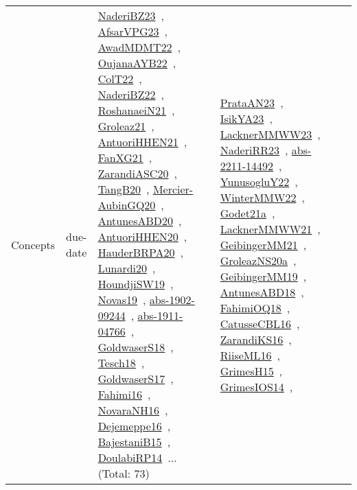 {\begin{longtable}{lp{3cm}>{\raggedright\arraybackslash}p{6cm}>{\raggedright\arraybackslash}p{6cm}>{\raggedright\arraybackslash}p{8cm}}
\index{due-date}\index{Concepts!due-date}Concepts & due-date & \href{../works/NaderiBZ23.pdf}{NaderiBZ23}~\cite{NaderiBZ23}, \href{../works/AfsarVPG23.pdf}{AfsarVPG23}~\cite{AfsarVPG23}, \href{../works/AwadMDMT22.pdf}{AwadMDMT22}~\cite{AwadMDMT22}, \href{../works/OujanaAYB22.pdf}{OujanaAYB22}~\cite{OujanaAYB22}, \href{../works/ColT22.pdf}{ColT22}~\cite{ColT22}, \href{../works/NaderiBZ22.pdf}{NaderiBZ22}~\cite{NaderiBZ22}, \href{../works/RoshanaeiN21.pdf}{RoshanaeiN21}~\cite{RoshanaeiN21}, \href{../works/Groleaz21.pdf}{Groleaz21}~\cite{Groleaz21}, \href{../works/AntuoriHHEN21.pdf}{AntuoriHHEN21}~\cite{AntuoriHHEN21}, \href{../works/FanXG21.pdf}{FanXG21}~\cite{FanXG21}, \href{../works/ZarandiASC20.pdf}{ZarandiASC20}~\cite{ZarandiASC20}, \href{../works/TangB20.pdf}{TangB20}~\cite{TangB20}, \href{../works/Mercier-AubinGQ20.pdf}{Mercier-AubinGQ20}~\cite{Mercier-AubinGQ20}, \href{../works/AntunesABD20.pdf}{AntunesABD20}~\cite{AntunesABD20}, \href{../works/AntuoriHHEN20.pdf}{AntuoriHHEN20}~\cite{AntuoriHHEN20}, \href{../works/HauderBRPA20.pdf}{HauderBRPA20}~\cite{HauderBRPA20}, \href{../works/Lunardi20.pdf}{Lunardi20}~\cite{Lunardi20}, \href{../works/HoundjiSW19.pdf}{HoundjiSW19}~\cite{HoundjiSW19}, \href{../works/Novas19.pdf}{Novas19}~\cite{Novas19}, \href{../works/abs-1902-09244.pdf}{abs-1902-09244}~\cite{abs-1902-09244}, \href{../works/abs-1911-04766.pdf}{abs-1911-04766}~\cite{abs-1911-04766}, \href{../works/GoldwaserS18.pdf}{GoldwaserS18}~\cite{GoldwaserS18}, \href{../works/Tesch18.pdf}{Tesch18}~\cite{Tesch18}, \href{../works/GoldwaserS17.pdf}{GoldwaserS17}~\cite{GoldwaserS17}, \href{../works/Fahimi16.pdf}{Fahimi16}~\cite{Fahimi16}, \href{../works/NovaraNH16.pdf}{NovaraNH16}~\cite{NovaraNH16}, \href{../works/Dejemeppe16.pdf}{Dejemeppe16}~\cite{Dejemeppe16}, \href{../works/BajestaniB15.pdf}{BajestaniB15}~\cite{BajestaniB15}, \href{../works/DoulabiRP14.pdf}{DoulabiRP14}~\cite{DoulabiRP14}... (Total: 73) & \href{../works/PrataAN23.pdf}{PrataAN23}~\cite{PrataAN23}, \href{../works/IsikYA23.pdf}{IsikYA23}~\cite{IsikYA23}, \href{../works/LacknerMMWW23.pdf}{LacknerMMWW23}~\cite{LacknerMMWW23}, \href{../works/NaderiRR23.pdf}{NaderiRR23}~\cite{NaderiRR23}, \href{../works/abs-2211-14492.pdf}{abs-2211-14492}~\cite{abs-2211-14492}, \href{../works/YunusogluY22.pdf}{YunusogluY22}~\cite{YunusogluY22}, \href{../works/WinterMMW22.pdf}{WinterMMW22}~\cite{WinterMMW22}, \href{../works/Godet21a.pdf}{Godet21a}~\cite{Godet21a}, \href{../works/LacknerMMWW21.pdf}{LacknerMMWW21}~\cite{LacknerMMWW21}, \href{../works/GeibingerMM21.pdf}{GeibingerMM21}~\cite{GeibingerMM21}, \href{../works/GroleazNS20a.pdf}{GroleazNS20a}~\cite{GroleazNS20a}, \href{../works/GeibingerMM19.pdf}{GeibingerMM19}~\cite{GeibingerMM19}, \href{../works/AntunesABD18.pdf}{AntunesABD18}~\cite{AntunesABD18}, \href{../works/FahimiOQ18.pdf}{FahimiOQ18}~\cite{FahimiOQ18}, \href{../works/CatusseCBL16.pdf}{CatusseCBL16}~\cite{CatusseCBL16}, \href{../works/ZarandiKS16.pdf}{ZarandiKS16}~\cite{ZarandiKS16}, \href{../works/RiiseML16.pdf}{RiiseML16}~\cite{RiiseML16}, \href{../works/GrimesH15.pdf}{GrimesH15}~\cite{GrimesH15}, \href{../works/GrimesIOS14.pdf}{GrimesIOS14}~\cite{GrimesIOS14}, 
\end{longtable}}
